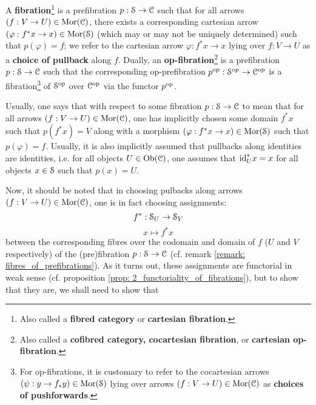             \begin{definition}[(Op)fibrations] \label{def: (op)fibrations}
                A \textbf{fibration}\footnote{Also called a \textbf{fibred category} or \textbf{cartesian fibration}.} is a prefibration $p: \S \to \C$ such that for all arrows $(f: V \to U) \in \Mor(\C)$, there exists a corresponding cartesian arrow $(\varphi: f^*x \to x) \in \Mor(\S)$ (which may or may not be uniquely determined) such that $p(\varphi) = f$; we refer to the cartesian arrow $\varphi: f^*x \to x$ lying over $f: V \to U$ as a \textbf{choice of pullback} along $f$. Dually, an \textbf{op-fibration}\footnote{Also called a \textbf{cofibred category, cocartesian fibration}, or \textbf{cartesian op-fibration}.} is a prefibration $p: \S \to \C$ such that the corresponding op-prefibration $p^{\op}: \S^{\op} \to \C^{\op}$ is a fibration\footnote{For op-fibrations, it is customary to refer to the cocartesian arrows $(\psi: y \to f_*y) \in \Mor(\S)$ lying over arrows $(f: V \to U) \in \Mor(\C)$ as \textbf{choices of pushforwards}.} of $\S^{\op}$ over $\C^{\op}$ via the functor $p^{\op}$.
            \end{definition}
            \begin{remark}
                Usually, one says that  with respect to some fibration $p: \S \to \C$ to mean that for all arrows $(f: V \to U) \in \Mor(\C)$, one has implicitly chosen some domain $f^*x$ such that $p(f^*x) = V$ along with a morphism $(\varphi: f^*x \to x) \in \Mor(\S)$ such that $p(\varphi) = f$. Usually, it is also implicitly assumed that pullbacks along identities are identities, i.e. for all objects $U \in \Ob(\C)$, one assumes that $\id_U^*x = x$ for all objects $x \in \S$ such that $p(x) = U$.
                
                Now, it should be noted that in choosing pulbacks along arrows $(f: V \to U) \in \Mor(\C)$, one is in fact choosing assignments:
                    $$f^*: \S_U \to \S_V$$
                    $$x \mapsto f^*x$$
                between the corresponding fibres over the codomain and domain of $f$ ($U$ and $V$ respectively) of the (pre)fibration $p: \S \to \C$ (cf. remark \ref{remark: fibres_of_prefibrations}). As it turns out, these assignments are functorial in weak sense (cf. proposition \ref{prop: 2_functoriality_of_fibrations}), but to show that they are, we shall need to show that 
            \end{remark}

